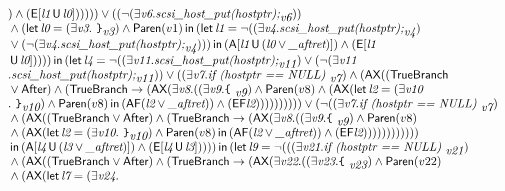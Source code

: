 \documentclass{article}
\newcommand{\U}{\,\mbox{\sf{U}}\,}
\newcommand{\A}{\mbox{\sf{A}}}
\newcommand{\E}{\mbox{\sf{E}}}
\newcommand{\AX}{\mbox{\sf{AX}}}
\newcommand{\AF}{\mbox{\sf{AF}}}
\newcommand{\EF}{\mbox{\sf{EF}}}
\newcommand{\mita}[1]{\mbox{\it{{#1}}}}
\newcommand{\msf}[1]{\mbox{\sf{{#1}}}}
\newcommand{\ttlb}{\mbox{\tt \char'173}}
\newcommand{\ttrb}{\mbox{\tt \char'175}}
\begin{document}
\[\begin{array}{l}
) \wedge (\E[\mita{l1} \U \mita{l0}]
)
)
))) \vee ((\neg (\exists \mita{v6} . \mita{scsi\_host\_put(hostptr);}_{\mita{v6}}))\\\mbox{} \wedge (\mita{\sf{let}} \, \mita{l0} = (\exists \mita{v3} . \mita{
{\ttrb}}_{\mita{v3}}) \wedge \msf{Paren}(v1) \, \mita{\sf{in}} \, (\mita{\sf{let}} \, \mita{l1} = \neg ((\exists \mita{v4} . \mita{scsi\_host\_put(hostptr);}_{\mita{v4}})\\\mbox{} \vee (\neg (\exists \mita{v4} . \mita{scsi\_host\_put(hostptr);}_{\mita{v4}}))) \, \mita{\sf{in}} \, (\A[\mita{l1} \U (\mita{l0} \vee \mita{\_aftret})]
) \wedge (\E[\mita{l1}\\\mbox{} \U \mita{l0}]
)
)
)) \, \mita{\sf{in}} \, (\mita{\sf{let}} \, \mita{l4} = \neg ((\exists \mita{v11} . \mita{scsi\_host\_put(hostptr);}_{\mita{v11}}) \vee (\neg (\exists \mita{v11}\\\mbox{} . \mita{scsi\_host\_put(hostptr);}_{\mita{v11}})) \vee ((\exists \mita{v7} . \mita{if (hostptr == NULL) }_{\mita{v7}}) \wedge (\AX((\msf{TrueBranch}\\\mbox{} \vee \msf{After}) \wedge (\msf{TrueBranch} \rightarrow (\AX(\exists \mita{v8} . ((\exists \mita{v9} . \mita{{\ttlb}
  }_{\mita{v9}}) \wedge \msf{Paren}(v8) \wedge (\AX(\mita{\sf{let}} \, \mita{l2} = (\exists \mita{v10}\\\mbox{} . \mita{
{\ttrb}}_{\mita{v10}}) \wedge \msf{Paren}(v8) \, \mita{\sf{in}} \, (\AF(\mita{l2} \vee \mita{\_aftret})) \wedge (\EF\mita{l2})
))))))))) \vee (\neg ((\exists \mita{v7} . \mita{if (hostptr == NULL) }_{\mita{v7}})\\\mbox{} \wedge (\AX((\msf{TrueBranch} \vee \msf{After}) \wedge (\msf{TrueBranch} \rightarrow (\AX(\exists \mita{v8} . ((\exists \mita{v9} . \mita{{\ttlb}
  }_{\mita{v9}}) \wedge \msf{Paren}(v8)\\\mbox{} \wedge (\AX(\mita{\sf{let}} \, \mita{l2} = (\exists \mita{v10} . \mita{
{\ttrb}}_{\mita{v10}}) \wedge \msf{Paren}(v8) \, \mita{\sf{in}} \, (\AF(\mita{l2} \vee \mita{\_aftret})) \wedge (\EF\mita{l2})
)))))))))))\\\mbox{} \, \mita{\sf{in}} \, (\A[\mita{l4} \U (\mita{l3} \vee \mita{\_aftret})]
) \wedge (\E[\mita{l4} \U \mita{l3}]
)
)
)) \, \mita{\sf{in}} \, (\mita{\sf{let}} \, \mita{l9} = \neg (((\exists \mita{v21} . \mita{if (hostptr == NULL) }_{\mita{v21}})\\\mbox{} \wedge (\AX((\msf{TrueBranch} \vee \msf{After}) \wedge (\msf{TrueBranch} \rightarrow (\AX(\exists \mita{v22} . ((\exists \mita{v23} . \mita{{\ttlb}
  }_{\mita{v23}}) \wedge \msf{Paren}(v22)\\\mbox{} \wedge (\AX(\mita{\sf{let}} \, \mita{l7} = (\exists \mita{v24} . \mita{
}
\end{array}\]
\end{document}
